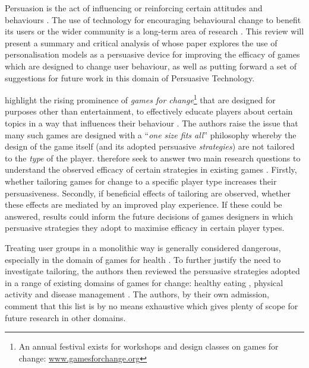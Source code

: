 \documentclass[11pt]{article}
\begin{document}
Persuasion is the act of influencing or reinforcing certain attitudes and behaviours \citep{khaled2008}. The use of technology for encouraging behavioural change to benefit its users or the wider community is a long-term area of research \citep{fogg2002}. This review will present a summary and critical analysis of \citet{orji2017} whose paper explores the use of personalisation models as a persuasive device for improving the efficacy of games which are designed to change user behaviour, as well as putting forward a set of suggestions for future work in this domain of Persuasive Technology.

\citet{orji2017} highlight the rising prominence of \textit{games for change}\footnote{An annual festival exists for workshops and design classes on games for change: \url{www.gamesforchange.org}} that are designed for purposes other than entertainment, to effectively educate players about certain topics in a way that influences their behaviour \citep{busch2015}.  The authors raise the issue that many such games are designed with a ``\textit{one size fits all}'' philosophy whereby the design of the game itself (and its adopted persuasive \textit{strategies}) are not tailored to the \textit{type} of the player. \citet{orji2017} therefore seek to answer two main research questions to understand the observed efficacy of certain strategies in existing games \citep{peng2009,kaipainen2012}. Firstly, whether tailoring games for change to a specific player type increases their persuasiveness. Secondly, if beneficial effects of tailoring are observed, whether these effects are mediated by an improved play experience. If these could be answered, results could inform the future decisions of games designers in which persuasive strategies they adopt to maximise efficacy in certain player types. 

Treating user groups in a monolithic way is generally considered dangerous, especially in the domain of games for health \citep{berkovsky2010}.  To further justify the need to investigate tailoring, the authors then reviewed the persuasive strategies adopted in a range of existing domains of games for change: healthy eating \citep{kaipainen2012, orji2013b}, physical activity \citep{fujiki2008} and disease management \citep{brownson2007}. The authors, by their own admission, comment that this list is by no means exhaustive which gives plenty of scope for future research in other domains.
\end{document}
